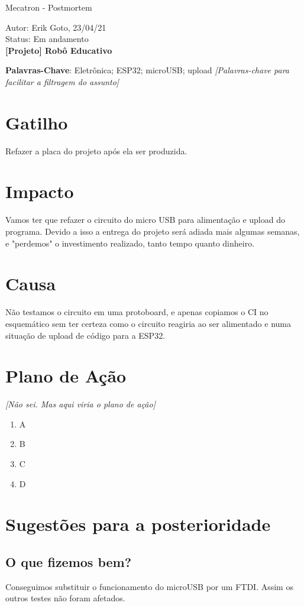\documentclass[a4paper, 12pt]{article}
\begin{document}
	\Large
	Mecatron - Postmortem
	
	Autor: Erik Goto, 23/04/21\\
	Status: Em andamento\\
	\textbf{[Projeto] Robô Educativo}\\
	\large
	
	\textbf{Palavras-Chave}:
	\normalsize
	Eletrônica; ESP32; microUSB; upload \textit{[Palavras-chave para facilitar a filtragem do assunto]}
	
	\section{Gatilho}
	Refazer a placa do projeto após ela ser produzida.
	
	\section{Impacto}
	Vamos ter que refazer o circuito do micro USB para alimentação e upload do programa. Devido a isso a entrega do projeto será adiada mais algumas semanas, e "perdemos" o investimento realizado, tanto tempo quanto dinheiro.
	
	\section{Causa}
	Não testamos o circuito em uma protoboard, e apenas copiamos o CI no esquemático sem ter certeza como o circuito reagiria ao ser alimentado e numa situação de upload de código para a ESP32.
	
	\section{Plano de Ação}
	\textit{[Não sei. Mas aqui viria o plano de ação]}
	\begin{enumerate}
		\item A
		\item B
		\item C
		\item D
	\end{enumerate}
	
	
	\section{Sugestões para a posterioridade}
	\subsection{O que fizemos bem?}
	Conseguimos substituir o funcionamento do microUSB por um FTDI. Assim os outros testes não foram afetados.
	
\end{document}
